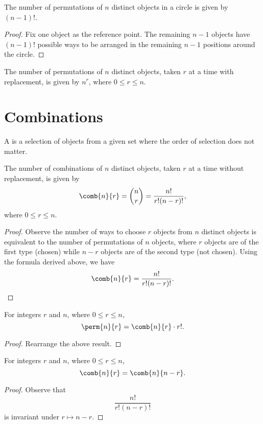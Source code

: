 \begin{proposition}
    The number of permutations of $n$ distinct objects in a circle is given by $(n-1)!$.
\end{proposition}
\begin{proof}
    Fix one object as the reference point. The remaining $n-1$ objects have $(n-1)!$ possible ways to be arranged in the remaining $n-1$ positions around the circle.
\end{proof}

\begin{proposition}
    The number of permutations of $n$ distinct objects, taken $r$ at a time with replacement, is given by $n^r$, where $0 \leq r \leq n$.
\end{proposition}

\section{Combinations}

\begin{definition}
    A  is a selection of objects from a given set where the order of selection does not matter.
\end{definition}

\begin{proposition}
    The number of combinations of $n$ distinct objects, taken $r$ at a time without replacement, is given by \[\comb{n}{r} = \binom{n}{r} = \frac{n!}{r! (n-r)!},\] where $0 \leq r \leq n$.
\end{proposition}
\begin{proof}
    Observe the number of ways to choose $r$ objects from $n$ distinct objects is equivalent to the number of permutations of $n$ objects, where $r$ objects are of the first type (chosen) while $n-r$ objects are of the second type (not chosen). Using the formula derived above, we have \[\comb{n}{r} = \frac{n!}{r! (n-r)!}.\]
\end{proof}
\begin{corollary}
    For integers $r$ and $n$, where $0 \leq r \leq n$, \[\perm{n}{r} = \comb{n}{r} \cdot r!.\]
\end{corollary}
\begin{proof}
    Rearrange the above result.
\end{proof}
\begin{corollary}
    For integers $r$ and $n$, where $0 \leq r \leq n$, \[\comb{n}{r} = \comb{n}{n-r}.\]
\end{corollary}
\begin{proof}
    Observe that \[\frac{n!}{r! (n-r)!}\] is invariant under $r \mapsto n - r$.
\end{proof}

